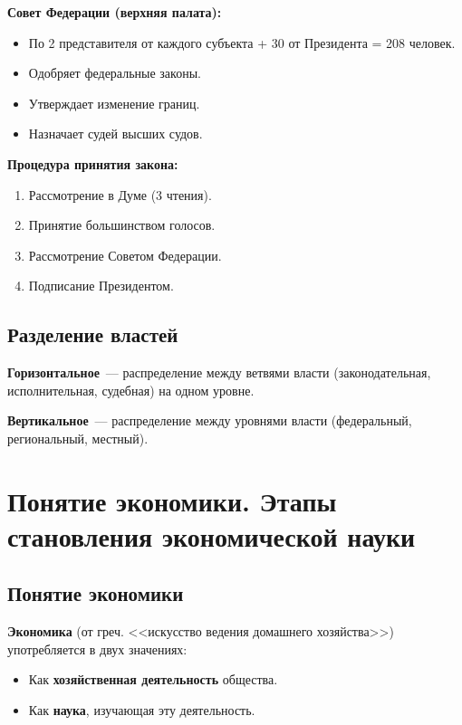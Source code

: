 \documentclass[12pt]{article}
\begin{document}
	\noindent \textbf{Совет Федерации (верхняя палата):}
	\begin{itemize}
		\item По 2 представителя от каждого субъекта + 30 от Президента = 208 человек.
		\item Одобряет федеральные законы.
		\item Утверждает изменение границ.
		\item Назначает судей высших судов.
	\end{itemize}
	
	\noindent \textbf{Процедура принятия закона:}
	\begin{enumerate}
		\item Рассмотрение в Думе (3 чтения).
		\item Принятие большинством голосов.
		\item Рассмотрение Советом Федерации.
		\item Подписание Президентом.
	\end{enumerate}
	
	\subsection{Разделение властей}
	
	\textbf{Горизонтальное}~--- распределение между ветвями власти (законодательная, исполнительная, судебная) на одном уровне.
	
	\textbf{Вертикальное}~--- распределение между уровнями власти (федеральный, региональный, местный).
	
	\section{Понятие экономики. Этапы становления экономической науки}
	
	\subsection{Понятие экономики}
	
	\textbf{Экономика} (от греч. <<искусство ведения домашнего хозяйства>>) употребляется в двух значениях:
	\begin{itemize}
		\item Как \textbf{хозяйственная деятельность} общества.
		\item Как \textbf{наука}, изучающая эту деятельность.
	\end{itemize}
	
\end{document}
